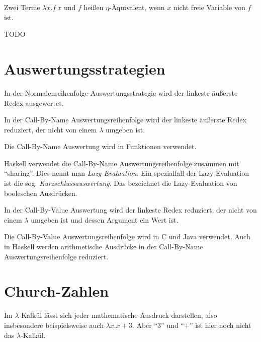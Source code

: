 \begin{definition}%
    Zwei Terme $\lambda x. f~x$ und $f$ heißen $\eta$-Äquivalent, wenn
    $x$ nicht freie Variable von $f$ ist.
\end{definition}

\begin{beispiel}
    TODO
\end{beispiel}

\section{Auswertungsstrategien}
\begin{definition}[Normalenreihenfolge]%
    In der Normalenreihenfolge-Auswertungsstrategie wird der linkeste äußerste
    Redex ausgewertet.
\end{definition}

\begin{definition}%
    In der Call-By-Name Auswertungsreihenfolge wird der linkeste äußerste Redex
    reduziert, der nicht von einem $\lambda$ umgeben ist.
\end{definition}

Die Call-By-Name Auswertung wird in Funktionen verwendet.

Haskell verwendet die Call-By-Name Auswertungsreihenfolge zusammen mit \enquote{sharing}. Dies nennt man \textit{Lazy Evaluation}. Ein spezialfall der Lazy-Evaluation ist die sog. \textit{Kurzschlussauswertung}.
Das bezeichnet die Lazy-Evaluation von booleschen Ausdrücken.


\begin{definition}%
    In der Call-By-Value Auswertung wird der linkeste Redex reduziert, der
    nicht von einem $\lambda$ umgeben ist und dessen Argument ein Wert ist.
\end{definition}

Die Call-By-Value Auswertungsreihenfolge wird in C und Java verwendet.
Auch in Haskell werden arithmetische Ausdrücke in der Call-By-Name Auswertungsreihenfolge reduziert.

\section{Church-Zahlen}
Im $\lambda$-Kalkül lässt sich jeder mathematische Ausdruck darstellen, also 
insbesondere beispielsweise auch $\lambda x. x+3$. Aber \enquote{$3$} und
\enquote{$+$} ist hier noch nicht das $\lambda$-Kalkül.

